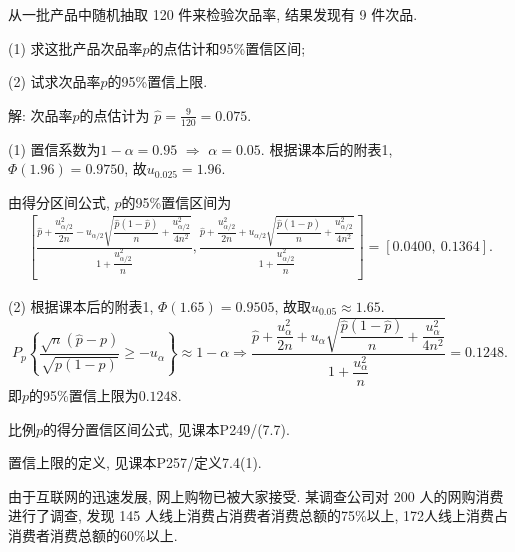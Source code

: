 \documentclass[standard]{ExBook}
\renewenvironment{shaded}{%
  \def\FrameCommand{\fboxsep=\FrameSep \colorbox{shadecolor}}%
  \MakeFramed{\advance\hsize-\width \FrameRestore}%
}{%
  \endMakeFramed
}
\begin{document}
\begin{qitems}
\vspace{2.5cm-5em}

    \begin{bbox}
    \begin{shaded}
        \qitem
从一批产品中随机抽取 120 件来检验次品率, 结果发现有 9 件次品.

(1) 求这批产品次品率$p$的点估计和95\%置信区间;

(2) 试求次品率$p$的95\%置信上限.
    \end{shaded}
    \end{bbox}

\vspace{\dimexpr2.5cm-5em\relax}

解: 次品率$p$的点估计为
$
\widehat{p}=\frac{9}{120}=0.075.
$

(1) 置信系数为$1-\alpha=0.95$ $\Longrightarrow$ $\alpha=0.05$. 根据课本后的附表1, $\Phi(1.96)=0.9750$, 故$u_{0.025}=1.96$.

由得分区间公式, $p$的95\%置信区间为
$$
\begin{aligned}
\left[
\frac{\widehat{p}+\dfrac{u_{\alpha/2}^2}{2n}
-u_{\alpha/2}\sqrt{\dfrac{\widehat{p}(1-\widehat{p})}{n}
+\dfrac{u_{\alpha/2}^2}{4n^2}}}
{1+\dfrac{u_{\alpha/2}^2}{n}},
\frac{\widehat{p}+\dfrac{u_{\alpha/2}^2}{2n}
+u_{\alpha/2}\sqrt{\dfrac{\widehat{p}(1-\widehat{p})}{n}
+\dfrac{u_{\alpha/2}^2}{4n^2}}}
{1+\dfrac{u_{\alpha/2}^2}{n}}
\right]
=
[0.0400,\ 0.1364].
\end{aligned}
$$

(2) 根据课本后的附表1, $\Phi(1.65)=0.9505$, 故取$u_{0.05}\approx1.65$. 
$$
P_p\left\{
\frac{\sqrt{n}(\widehat{p}-p)}
{\sqrt{p(1-p)}}
\geq-u_{\alpha}
\right\}
\approx1-\alpha
\Longrightarrow
\frac{\widehat{p}+\dfrac{u_{\alpha}^2}{2n}
+u_{\alpha}\sqrt{\dfrac{\widehat{p}(1-\widehat{p})}{n}
+\dfrac{u_{\alpha}^2}{4n^2}}}
{1+\dfrac{u_{\alpha}^2}{n}}
=
0.1248.
$$
即$p$的95\%置信上限为$0.1248$.

\textcolor{themeColor}{\selectfont {}
比例$p$的得分置信区间公式, 见课本P249/(7.7).}

\textcolor{themeColor}{\selectfont {}
置信上限的定义, 见课本P257/定义7.4(1).}

\vspace{2.5cm-5em}

    \begin{bbox}
    \begin{shaded}
        \qitem
由于互联网的迅速发展, 网上购物已被大家接受. 某调查公司对 200 人的网购消费进行了调查, 发现 145 人线上消费占消费者消费总额的75\%以上, 172人线上消费占消费者消费总额的60\%以上.


\end{shaded}
\end{bbox}
\end{qitems}
\end{document}
